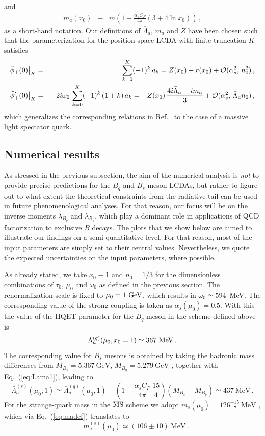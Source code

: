 \documentclass[a4paper,11pt]{article}
\begin{document}
and 
\begin{eqnarray}
    m_a(x_0) &\equiv & m \left( 1 - \frac{\alpha_s C_F}{4\pi} \left( 3+4 \ln x_0 \right) \right) \,,
    \label{eq:madef}
\end{eqnarray}
as a short-hand notation.
Our definitions of $\bar\Lambda_a$, $m_a$ and $Z$  have been chosen such that the parameterization for the position-space LCDA with finite truncation $K$ satisfies
\begin{eqnarray}
 \tilde\phi_+(0)\big|_K &=& \sum_{k=0}^K (-1)^k \, a_k = Z(x_0) - r(x_0)
 + {\cal O}(\alpha_s^2,\, n_0^2) \,,
 \cr 
  \tilde\phi_+'(0)\big|_K &=& - 2 i \omega_0 \, \sum_{k=0}^K (-1)^k \, (1+k) \, a_k
  = - Z(x_0) \, \frac{4 i \bar \Lambda_a- i m_a}{3} + {\cal O}(\alpha_s^2,\, \bar \Lambda_a n_0) \,,
  \label{eq:Lama_scheme}
\end{eqnarray}
which generalizes the corresponding relations in Ref.~\cite{Feldmann:2022uok} to the case of a massive light spectator quark.
%


\subsection{Numerical results}

As stressed in the previous subsection, the aim of the numerical analysis is \emph{not} to provide precise predictions for 
the $B_q$ and $B_s$-meson LCDAs, but rather to figure out to what extent the theoretical constraints from 
the radiative tail can be used in future phenomenological analyses. For that reason, our focus will be on the inverse moments $\lambda_{B_q}$ and $\lambda_{B_s}$, which play a dominant role in applications of QCD factorization to exclusive $B$ decays. The plots that we show below are aimed to illustrate 
our findings on a semi-quantitative level. For that reason, most of the input parameters are simply set to their central values.
Nevertheless, we quote the expected uncertainties on the input parameters, where possible.


As already stated, we take $x_0\equiv 1$ and $n_0=1/3$ for the dimensionless combinations of $\tau_0$, $\mu_0$ and $\omega_0$ as defined in the previous section.
The renormalization scale is fixed to
$\mu_0=1~{\rm GeV}$, which results in $\omega_0 \simeq 594$~MeV.
The corresponding value of the strong coupling is taken as $\alpha_s(\mu_0)=0.5$. With this the value of the HQET parameter for the $B_q$ meson in the scheme defined above is \cite{Feldmann:2022uok}
$$
\bar\Lambda_a^{(q)}(\mu_0, x_0=1) \simeq 367~{\rm MeV} \,. 
$$
The corresponding value for $B_s$ mesons is obtained by taking the hadronic mass
differences from $M_{B_s} = 5.367~\mathrm{GeV}$, $M_{B_q} = 5.279~\mathrm{GeV}$ \cite{ParticleDataGroup:2022pth},
together with Eq.~(\ref{eq:Lama1}), leading to 
$$
\bar\Lambda_a^{(s)}(\mu_0,1) \simeq \bar\Lambda_a^{(q)}(\mu_0, 1) 
    + \left(1-\frac{\alpha_s C_F}{4\pi} \, \frac{15}{4} \right) (M_{B_s}-M_{B_q}) \simeq 437~\mathrm{MeV} \,.
$$
For the strange-quark mass in the $\overline{\rm MS}$ scheme we adopt
$m_s(\mu_0)= 126^{+15}_{-7}~\mathrm{MeV}$ \cite{ParticleDataGroup:2022pth},
which via Eq.~(\ref{eq:madef}) translates to 
$$
\quad m_a^{(s)}(\mu_0) \simeq (106 \pm 10)~\mathrm{MeV} \,.
$$
%
\end{document}
